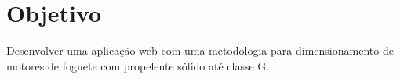\section{Objetivo}
\justifying
Desenvolver uma aplicação web com uma metodologia para dimensionamento de motores de foguete com propelente sólido até classe G.